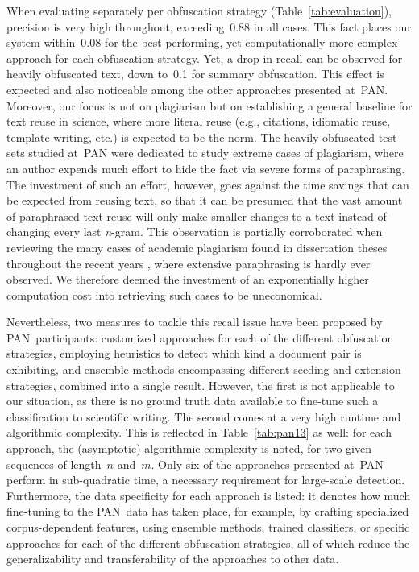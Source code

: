 When evaluating separately per obfuscation strategy (Table~\ref{tab:evaluation}), precision is very high throughout, exceeding~0.88 in all cases. This fact places our system within~0.08 for the best-performing, yet computationally more complex approach for each obfuscation strategy. Yet, a drop in recall can be observed for heavily obfuscated text, down to~0.1 for summary obfuscation. This effect is expected and also noticeable among the other approaches presented at~PAN. Moreover, our focus is not on plagiarism but on establishing a general baseline for text reuse in science, where more literal reuse (e.g., citations, idiomatic reuse, template writing, etc.) is expected to be the norm. The heavily obfuscated test sets studied at~PAN were dedicated to study extreme cases of plagiarism, where an author expends much effort to hide the fact via severe forms of paraphrasing. The investment of such an effort, however, goes against the time savings that can be expected from reusing text, so that it can be presumed that the vast amount of paraphrased text reuse will only make smaller changes to a text instead of changing every last \emph{n}-gram. This observation is partially corroborated when reviewing the many cases of academic plagiarism found in dissertation theses throughout the recent years \cite{vroniplag:2021}, where extensive paraphrasing is hardly ever observed. We therefore deemed the investment of an exponentially higher computation cost into retrieving such cases to be uneconomical.

Nevertheless, two measures to tackle this recall issue have been proposed by PAN~participants:
\Ni
customized approaches for each of the different obfuscation strategies, employing heuristics to detect which kind a document pair is exhibiting, and
\Nii
ensemble methods encompassing different seeding and extension strategies, combined into a single result.
However, the first is not applicable to our situation, as there is no ground truth data available to fine-tune such a classification to scientific writing. The second comes at a very high runtime and algorithmic complexity.
This is reflected in Table~\ref{tab:pan13} as well: for each approach, the (asymptotic) algorithmic complexity is noted, for two given sequences of length~$n$ and~$m$. Only six of the approaches presented at~PAN perform in sub-quadratic time, a necessary requirement for large-scale detection. Furthermore, the data specificity for each approach is listed: it denotes how much fine-tuning to the PAN~data has taken place, for example, by crafting specialized corpus-dependent features, using ensemble methods, trained classifiers, or specific approaches for each of the different obfuscation strategies, all of which reduce the generalizability and transferability of the approaches to other data. 


